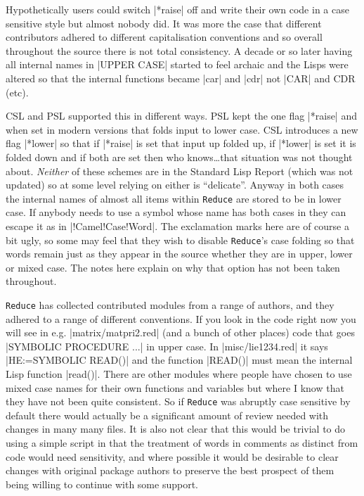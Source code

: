 \documentclass[12pt,twoside,openright]{memoir}
\newcommand{\reduce}{\texttt{Reduce}\xspace}
\begin{document}
Hypothetically users could switch |*raise| off and write their own code
in a case
sensitive style but almost nobody did. It was more the case that different
contributors adhered to different capitalisation conventions and so overall
throughout the source there is not total consistency. A decade or so
later having all internal
names in |UPPER CASE| started to feel archaic and the Lisps were altered so
that the internal functions became |car| and |cdr| not |CAR| and CDR (etc).

CSL and PSL supported this in different ways.  PSL kept the one flag |*raise|
and when set in modern versions that folds input to lower case. CSL introduces
a new flag |*lower| so that if |*raise| is set that input up folded up, if
|*lower| is set it is folded down and if both are set then who knows\dots that
situation was not thought about.  \emph{Neither} of these schemes are in the
Standard Lisp Report (which was not updated) so at some level relying on
either is ``delicate''.  Anyway in both cases the internal names of almost
all items within \reduce are stored
to be in lower case. If anybody needs to use a symbol whose name has both cases
in they can escape it as in |!Camel!Case!Word|. The exclamation marks here
are of course a bit ugly, so some may feel that they wish to disable
\reduce's case folding so that words remain just as they appear in the
source whether they are in upper, lower or mixed case. The notes here explain
on why that option has not been taken throughout. 

\reduce has collected contributed modules from a range of authors, and
they adhered to a range of different conventions. If you look in the code
right now you will see in e.g. |matrix/matpri2.red| (and a bunch of other
places) code that goes |SYMBOLIC PROCEDURE ...| in upper case.
In |misc/lie1234.red| it says |HE:=SYMBOLIC READ()| and the function |READ()|
must mean the internal Lisp function |read()|.
There are other modules where people have chosen to use mixed
case names for their own functions and variables but where I know that they
have not been quite consistent. So if \reduce was abruptly case sensitive
by default there would actually be a significant amount of review needed
with changes in many many files. It is also not clear that this would be
trivial to do using a simple script in that the treatment of words in
comments as distinct from code would need sensitivity, and where possible
it would be desirable to clear changes with original package authors to
preserve the best prospect of them being willing to continue with some support.
\end{document}
